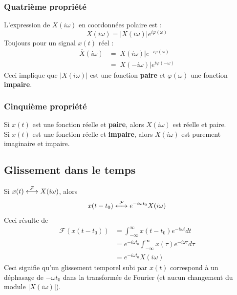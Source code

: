	
		\subsubsection{Quatrième propriété}
		L'expression de $X(i\omega)$ en coordonnées polaire est : 
		\begin{equation}
		X(i\omega) = |X(i\omega)|e^{i\varphi(\omega)}
		\end{equation}
		Toujours pour un signal $x(t)$ réel :
		\begin{equation}
		\begin{array}{ll}
		\overline{X}(i\omega) &= |X(i\omega)|e^{-i\varphi(\omega)}\\
		 &= |X(-i\omega)|e^{i\varphi(-\omega)}
		\end{array}
		\end{equation}
		Ceci implique que $|X(i\omega)|$ est une fonction \textbf{paire} 
		et $\varphi(\omega)$ une fonction \textbf{impaire}.
		
	
		\subsubsection{Cinquième propriété}
		Si $x(t)$ est une fonction réelle et \textbf{paire}, alors $X(i
		\omega)$ est réelle et paire.\\
		Si $x(t)$ est une fonction réelle et \textbf{impaire}, alors 
		$X(i\omega)$ est purement imaginaire et impaire.
		
	\subsection{Glissement dans le temps}
	Si $x(t) \ft X(i\omega)$, alors 
	\begin{equation}
	x(t-t_0) \ft e^{-i\omega t_0}X(i\omega)
	\end{equation}
	Ceci résulte de 
	\begin{equation}
	\begin{array}{ll}
	\mathcal{F}(x(t-t_0)) &= \int_{-\infty}^\infty x(t-t_0)e^{-i\omega t}dt\\
	&= e^{-i\omega t_0} \int_{-\infty}^\infty x(\tau)e^{-i\omega\tau}d\tau \\
	&= e^{-i\omega t_0}X(i\omega)
	\end{array}
	\end{equation}
	Ceci signifie qu'un glissement temporel subi par $x(t)$ correspond à un 
	déphasage de $-\omega t_0$ dans la transformée de Fourier (et aucun 
	changement du module $|X(i\omega)|$).
	
